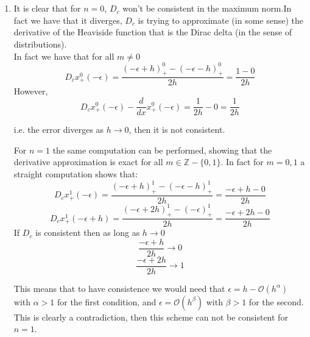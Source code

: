 \documentclass{article}
\numberwithin{equation}{section}
\begin{document}
    \section{}
    \begin{enumerate}[label=(\alph*)]
        \item It is clear that for $n = 0$, $D_c$ won’t be consistent in the maximum norm.In fact we have that it diverges, $D_c$ is trying to approximate (in some sense) the derivative of the Heaviside function that is the Dirac delta (in the sense of distributions).\\
        In fact we have that for all $m\not=0$
        \begin{equation}
            D_c x_{+}^0 (-\epsilon) = \frac{(-\epsilon+h)_{+}^0 - (-\epsilon - h)_{+}^0}{2h} = \frac{1-0}{2h}
        \end{equation}
        However,
        \begin{equation}
            D_c x_{+}^0 (-\epsilon) -\frac{d}{dx} x_{+}^0 (-\epsilon) = \frac{1}{2h} - 0 = \frac{1}{2h}
        \end{equation}

        i.e. the error diverges as $h \to 0$, then it is not consistent.

        For $n = 1$ the same computation can be performed, showing that the derivative approximation is exact for all $m \in \mathbb{Z}-\{0,1\}$. In fact for $m = 0,1$ a straight computation shows that:
            $$D_c x_{+}^1 (-\epsilon) = \frac{(-\epsilon+h)_{+}^1 - (-\epsilon - h)_{+}^1}{2h} = \frac{-\epsilon+h-0}{2h}$$
            $$D_c x_{+}^1 (-\epsilon+h) = \frac{(-\epsilon+2h)_{+}^1 - (-\epsilon)_{+}^1}{2h} = \frac{-\epsilon+2h-0}{2h}$$
        If $D_c$ is consistent then as long as $h\to 0$
            $$\frac{-\epsilon+h}{2h} \to 0$$
            $$\frac{-\epsilon + 2h}{2h} \to 1$$

        This means that to have consistence we would need that $\epsilon = h - \mathcal{O}(h^{\alpha})$ with $\alpha > 1$ for the first condition, and $\epsilon = \mathcal{O}(h^{\beta})$ with $\beta>1$ for the second. This is clearly a contradiction, then this scheme can not be consistent for $n=1$.


\end{enumerate}
\end{document}
